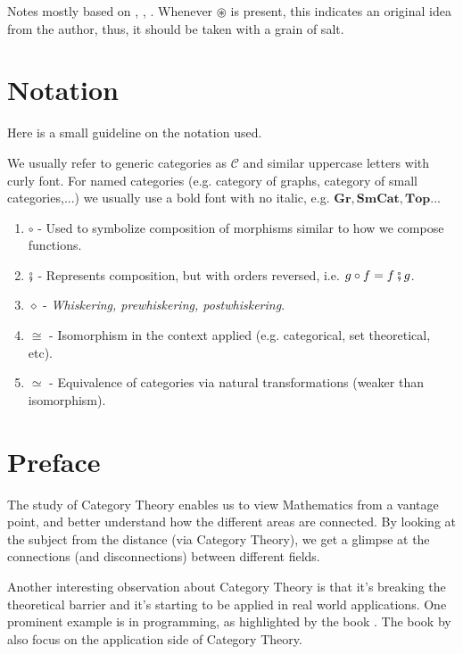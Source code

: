Notes mostly based on \citet{maico2020categoria},
\citet{bradley2020topology}, \citet{borceux1994handbook}.
Whenever $\circledast$ is present, this indicates an original idea from the author,
thus, it should be taken with a grain of salt.

\section*{Notation}

Here is a small guideline on the notation used.

We usually refer to generic categories as $\mathcal C$ and similar uppercase letters with
curly font. For named categories (e.g. category of graphs, category of small categories,...)
we usually use a bold font with no italic, e.g. $\mathbf{Gr}, \mathbf{SmCat}, \mathbf{Top}$...

\begin{enumerate}
  \item $\circ$ - Used to symbolize composition of morphisms similar to how we compose functions.
  \item $\fatsemi$ - Represents composition, but with orders reversed, i.e. $g\circ f = f \fatsemi g$.
  \item $\diamond$ - \textit{Whiskering, prewhiskering, postwhiskering}.
  \item $\cong$ - Isomorphism in the context applied (e.g. categorical, set theoretical, etc).
  \item $\simeq$ - Equivalence of categories via natural transformations (weaker than isomorphism).
\end{enumerate}

\newpage
\section{Preface}

The study of Category Theory enables us to view Mathematics from a vantage
point, and better understand how the different areas are connected.
By looking at the subject from the distance (via Category Theory), we get
a glimpse at the connections (and disconnections) between different fields.

Another interesting observation about Category Theory is that it's
breaking the theoretical barrier and it's starting to be applied
in real world applications. One prominent example is in programming,
as highlighted by the book \citet{milewski2018category}.
The book by \citet{fong2019invitation} also focus on the application
side of Category Theory.

